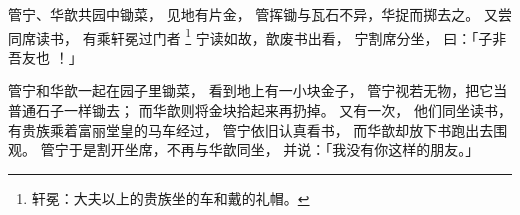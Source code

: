 
\switchcolumn*[\section{}]

管宁、华歆共园中锄菜，
见地有片金，
管挥锄与瓦石不异，华捉而掷去之。
又尝同席读书，
有乘轩冕过门者%
\footnote{%
    轩冕：大夫以上的贵族坐的车和戴的礼帽。
}%
宁读如故，歆废书出看，
宁割席分坐，
曰：「子非吾友也 ！」

\switchcolumn

管宁和华歆一起在园子里锄菜，
看到地上有一小块金子，
管宁视若无物，把它当普通石子一样锄去；
而华歆则将金块拾起来再扔掉。
又有一次，
他们同坐读书，
有贵族乘着富丽堂皇的马车经过，
管宁依旧认真看书，
而华歆却放下书跑出去围观。
管宁于是割开坐席，不再与华歆同坐，
并说：「我没有你这样的朋友。」

